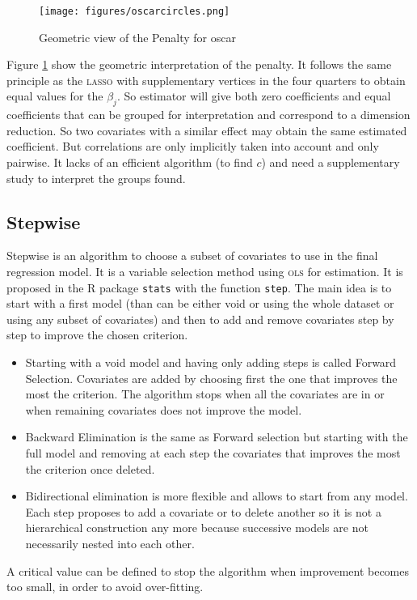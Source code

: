 \documentclass[12pt,a4paper]{report}
\begin{document}
\begin{figure}[h!]
			\centering
			\texttt{[image: figures/oscarcircles.png]} 
			\caption{Geometric view of the Penalty for {\sc oscar}}\label{oscarcircles}
		\end{figure} 
Figure 	\ref{oscarcircles} show the geometric interpretation of the penalty. It follows the same principle as the \textsc{lasso} with supplementary vertices in the four quarters to obtain equal values for the $\beta_j$. So estimator will give both zero coefficients and equal coefficients that can be grouped for interpretation and correspond to a dimension reduction. So two covariates with a similar effect may obtain the same estimated coefficient. But correlations are only implicitly taken into account and only pairwise. It lacks of an efficient algorithm  (to find $c$) and need a supplementary study to interpret the groups found.
		\subsection{Stepwise}
			
			Stepwise \cite{seber2012linear} is an algorithm to choose a subset of covariates to use in the final regression model. It is a variable selection method using \textsc{ols} for estimation. It is proposed in the R package {\tt stats} with the function {\tt step}. The main idea is to start with a first model (than can be either void or using the whole dataset or using any subset of covariates) and then to add and remove covariates step by step to improve the chosen criterion. \\
			\begin{itemize}
				\item 	Starting with a void model and having only adding steps is called Forward Selection. Covariates are added by choosing first the one that improves the most the criterion. The algorithm stops when all the covariates are in or when remaining covariates does not improve the model.
				\item Backward Elimination is the same as Forward selection but starting with the full model and removing at each step the covariates that improves the most the criterion once deleted.
				\item Bidirectional elimination is more flexible and allows to start from any model. Each step proposes to add a covariate or to delete another so it is not a hierarchical construction any more because successive models are not necessarily nested into each other.
			\end{itemize}
		A critical value can be defined to stop the algorithm when improvement becomes too small, in order to avoid over-fitting. \\
		
\end{document}
